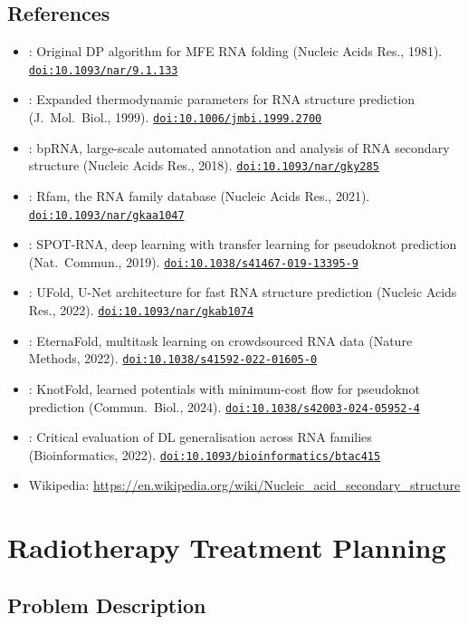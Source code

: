 \documentclass[11pt]{article}
\newcommand{\doi}[1]{\href{https://doi.org/#1}{\texttt{doi:#1}}}
\begin{document}
\subsection*{References}

\begin{itemize}[noitemsep]
  \item \cite{ZukerStiegler1981}: Original DP algorithm for MFE RNA folding 
    (Nucleic Acids Res., 1981). \doi{10.1093/nar/9.1.133}
  \item \cite{Mathews1999}: Expanded thermodynamic parameters for RNA structure 
    prediction (J.\ Mol.\ Biol., 1999). \doi{10.1006/jmbi.1999.2700}
  \item \cite{Danaee2018}: bpRNA, large-scale automated annotation and analysis of RNA
    secondary structure (Nucleic Acids Res., 2018). \doi{10.1093/nar/gky285}
  \item \cite{Rfam}: Rfam, the RNA family database (Nucleic Acids Res., 2021).
    \doi{10.1093/nar/gkaa1047}
  \item \cite{SPOTRNA2019}: SPOT-RNA, deep learning with transfer learning for 
    pseudoknot prediction (Nat.\ Commun., 2019). \doi{10.1038/s41467-019-13395-9}
  \item \cite{UFold2022}: UFold, U-Net architecture for fast RNA structure prediction 
    (Nucleic Acids Res., 2022). \doi{10.1093/nar/gkab1074}
  \item \cite{Wayment2022}: EternaFold, multitask learning on crowdsourced RNA data 
    (Nature Methods, 2022). \doi{10.1038/s41592-022-01605-0}
  \item \cite{KnotFold2024}: KnotFold, learned potentials with minimum-cost flow for 
    pseudoknot prediction (Commun.\ Biol., 2024). \doi{10.1038/s42003-024-05952-4}
  \item \cite{Szikszai2022}: Critical evaluation of DL generalisation across RNA families 
    (Bioinformatics, 2022). \doi{10.1093/bioinformatics/btac415}
  \item Wikipedia: \url{https://en.wikipedia.org/wiki/Nucleic_acid_secondary_structure}
\end{itemize}

\section{Radiotherapy Treatment Planning}

\subsection*{Problem Description}
\end{document}
